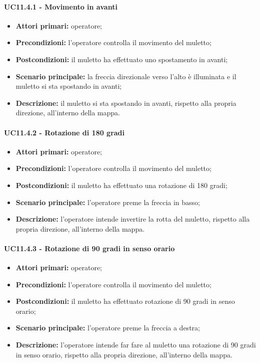 \paragraph{UC11.4.1 - Movimento in avanti}
\begin{itemize}
	\item 	\textbf{Attori primari:} operatore;
	\item 	\textbf{Precondizioni:} l'operatore controlla il movimento del muletto;
	\item 	\textbf{Postcondizioni:} il muletto ha effettuato uno spostamento in avanti; 
	\item 	\textbf{Scenario principale:} la freccia direzionale verso l'alto è illuminata e il muletto si sta spostando in avanti;
	\item 	\textbf{Descrizione:} il muletto si sta spostando in avanti, rispetto alla propria direzione, all'interno della mappa.

\end{itemize}

\paragraph{UC11.4.2 - Rotazione di 180 gradi}
\begin{itemize}
	\item 	\textbf{Attori primari:} operatore;
	\item 	\textbf{Precondizioni:} l'operatore controlla il movimento del muletto;
	\item 	\textbf{Postcondizioni:} il muletto ha effettuato una rotazione di 180 gradi; 
	\item 	\textbf{Scenario principale:} l'operatore preme la freccia in basso;
	\item 	\textbf{Descrizione:} l'operatore intende invertire la rotta del muletto, rispetto alla propria direzione, all'interno della mappa.
\end{itemize}

\paragraph{UC11.4.3 - Rotazione di 90 gradi in senso orario}
\begin{itemize}
	\item 	\textbf{Attori primari:} operatore;
	\item 	\textbf{Precondizioni:} l'operatore controlla il movimento del muletto;
	\item 	\textbf{Postcondizioni:} il muletto ha effettuato rotazione di 90 gradi in senso orario; 
	\item 	\textbf{Scenario principale:} l'operatore preme la freccia a destra;
	\item 	\textbf{Descrizione:} l'operatore intende far fare al muletto una rotazione di 90 gradi in senso orario, rispetto alla propria direzione, all'interno della mappa.
\end{itemize}

